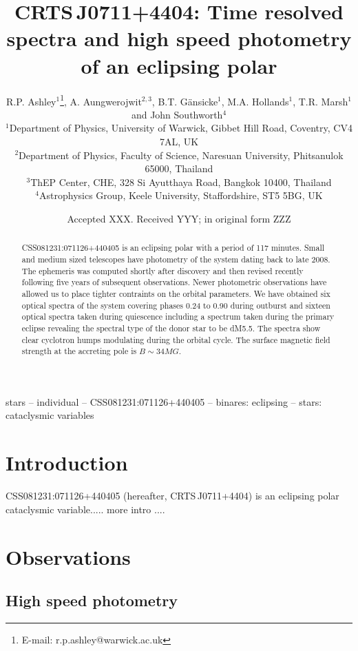 \documentclass[a4paper,fleqn,usenatbib]{mnras}
\title[CRTS\,J0711+4404]{CRTS\,J0711+4404: Time resolved spectra and high speed photometry of an eclipsing polar}
\author[R.P. Ashley et al.]{
R.P. Ashley$^{1}$\thanks{E-mail: r.p.ashley@warwick.ac.uk},
A. Aungwerojwit$^{2, 3}$,
B.T. G{\"a}nsicke$^{1}$,
M.A. Hollands$^{1}$,
T.R. Marsh$^{1}$ and \newauthor
John Southworth$^{4}$
\\
$^{1}$Department of Physics, University of Warwick, Gibbet Hill Road, Coventry, CV4 7AL, UK\\
$^{2}$Department of Physics, Faculty of Science, Naresuan University, Phitsanulok 65000, Thailand\\
$^{3}$ThEP Center, CHE, 328 Si Ayutthaya Road, Bangkok 10400, Thailand\\
$^{4}$Astrophysics Group, Keele University, Staffordshire, ST5 5BG, UK
}
\date{Accepted XXX. Received YYY; in original form ZZZ}
\begin{document}
\label{firstpage}
\pagerange{\pageref{firstpage}--\pageref{lastpage}}
\maketitle

\begin{abstract}
CSS081231:071126+440405 is an eclipsing polar with a period of 117 minutes. Small and medium sized telescopes have photometry of the system dating back to late 2008. The ephemeris was computed shortly after discovery and then revised recently following five years of subsequent observations. Newer photometric observations have allowed us to place tighter contraints on the orbital parameters. We have obtained six optical spectra of the system covering phases 0.24 to 0.90 during outburst and sixteen optical spectra taken during quiescence including a spectrum taken during the primary eclipse revealing the spectral type of the donor star to be dM5.5. The spectra show clear cyclotron humps modulating during the orbital cycle. The surface magnetic field strength at the accreting pole is $B  \sim 34 MG$.
\end{abstract}

\begin{keywords}
stars -- individual -- CSS081231:071126+440405 -- binares: eclipsing -- stars: cataclysmic variables
\end{keywords}



\section{Introduction}
CSS081231:071126+440405 (hereafter,  CRTS\,J0711+4404) is an eclipsing polar cataclysmic variable..... more intro ....

\section{Observations}
\subsection{High speed photometry}
\end{document}

